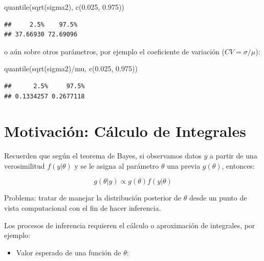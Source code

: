 \documentclass[
  12pt,
]{book}
\newenvironment{Shaded}{\begin{snugshade}}{\end{snugshade}}
\newcommand{\FloatTok}[1]{\textcolor[rgb]{0.00,0.00,0.81}{#1}}
\newcommand{\FunctionTok}[1]{\textcolor[rgb]{0.00,0.00,0.00}{#1}}
\newcommand{\NormalTok}[1]{#1}
\newcommand{\SpecialCharTok}[1]{\textcolor[rgb]{0.00,0.00,0.00}{#1}}
\providecommand{\tightlist}{%
  \setlength{\itemsep}{0pt}\setlength{\parskip}{0pt}}
\theoremstyle{definition}
\theoremstyle{definition}
\theoremstyle{definition}
\theoremstyle{definition}
\theoremstyle{remark}
\begin{document}
\begin{Shaded}
\begin{Highlighting}[]
\FunctionTok{quantile}\NormalTok{(}\FunctionTok{sqrt}\NormalTok{(sigma2), }\FunctionTok{c}\NormalTok{(}\FloatTok{0.025}\NormalTok{, }\FloatTok{0.975}\NormalTok{))}
\end{Highlighting}
\end{Shaded}

\begin{verbatim}
##     2.5%    97.5% 
## 37.66930 72.69096
\end{verbatim}

o aún sobre otros parámetros, por ejemplo el coeficiente de variación (\(CV=\sigma/\mu\)):

\begin{Shaded}
\begin{Highlighting}[]
\FunctionTok{quantile}\NormalTok{(}\FunctionTok{sqrt}\NormalTok{(sigma2)}\SpecialCharTok{/}\NormalTok{mu, }\FunctionTok{c}\NormalTok{(}\FloatTok{0.025}\NormalTok{, }\FloatTok{0.975}\NormalTok{))}
\end{Highlighting}
\end{Shaded}

\begin{verbatim}
##      2.5%     97.5% 
## 0.1334257 0.2677118
\end{verbatim}

\hypertarget{motivaciuxf3n-cuxe1lculo-de-integrales}{%
\section{Motivación: Cálculo de Integrales}\label{motivaciuxf3n-cuxe1lculo-de-integrales}}

Recuerden que según el teorema de Bayes, si observamos datos \(y\) a partir de una verosimilitud \(f(y|\theta)\) y se le asigna al parámetro \(\theta\) una previa \(g(\theta)\), entonces:

\[g(\theta|y)\propto g(\theta)f(y|\theta)\]

Problema: tratar de manejar la distribución posterior de \(\theta\) desde un punto de vista computacional con el fin de hacer inferencia.

Los procesos de inferencia requieren el cálculo o aproximación de integrales, por ejemplo:

\begin{itemize}
\tightlist
\item
  Valor esperado de una función de \(\theta\):
\end{itemize}
\end{document}
